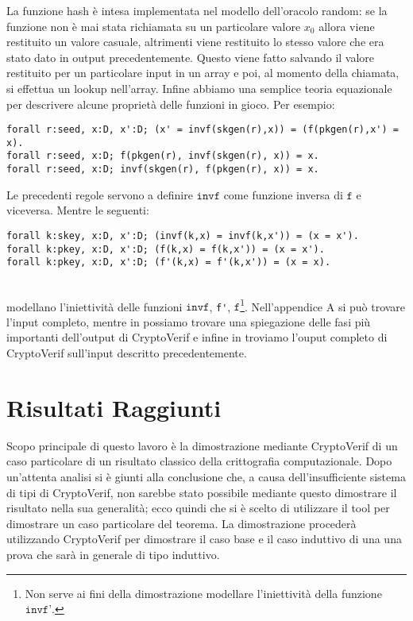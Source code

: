 \documentclass[a4paper,openright,twoside,12pt]{report}
\begin{document}
La funzione hash \`e intesa implementata nel modello dell'oracolo random: se la funzione non \`e mai stata richiamata su un particolare valore $x_0$ allora viene restituito un valore casuale, 
altrimenti viene restituito lo stesso valore che era stato dato in output precedentemente. Questo viene fatto salvando il valore restituito per un particolare input in un array e poi,
al momento della chiamata, si effettua un lookup nell'array.
Infine abbiamo una semplice teoria equazionale per descrivere alcune propriet\`a delle funzioni in gioco.
Per esempio:
\begin{verbatim}
forall r:seed, x:D, x':D; (x' = invf(skgen(r),x)) = (f(pkgen(r),x') = x).
forall r:seed, x:D; f(pkgen(r), invf(skgen(r), x)) = x.
forall r:seed, x:D; invf(skgen(r), f(pkgen(r), x)) = x.
\end{verbatim}
Le precedenti regole servono a definire $\texttt{invf}$ come funzione inversa di $\texttt{f}$ e viceversa. Mentre le seguenti:
\begin{verbatim}
forall k:skey, x:D, x':D; (invf(k,x) = invf(k,x')) = (x = x').
forall k:pkey, x:D, x':D; (f(k,x) = f(k,x')) = (x = x').
forall k:pkey, x:D, x':D; (f'(k,x) = f'(k,x')) = (x = x).
\end{verbatim}\\
modellano l'iniettivit\`a delle funzioni $\texttt{invf}$, \verb!f'!, $\texttt{f}$\footnote{Non serve ai fini della dimostrazione modellare l'iniettivit\`a della funzione $\texttt{invf'}$. }.
Nell'appendice A si pu\`o trovare l'input completo, mentre in \cite{BlanchetPointchevalCrypto06} possiamo trovare una spiegazione delle fasi 
pi\`u importanti dell'output di CryptoVerif e infine in \cite{fdhall} troviamo l'ouput completo di CryptoVerif sull'input descritto precedentemente.

\chapter{Risultati Raggiunti}
Scopo principale di questo lavoro \`e la dimostrazione mediante CryptoVerif di un caso particolare di un risultato classico della crittografia computazionale.
Dopo un'attenta analisi si \`e giunti alla conclusione che, a causa dell'insufficiente sistema di tipi di CryptoVerif, non sarebbe stato
possibile mediante questo dimostrare il risultato nella sua generalit\`a; ecco quindi che si \`e scelto di utilizzare il tool
per dimostrare un caso particolare del teorema. La dimostrazione proceder\`a utilizzando CryptoVerif per dimostrare il caso base e il caso induttivo
di una una prova che sar\`a in generale di tipo induttivo.
\end{document}
